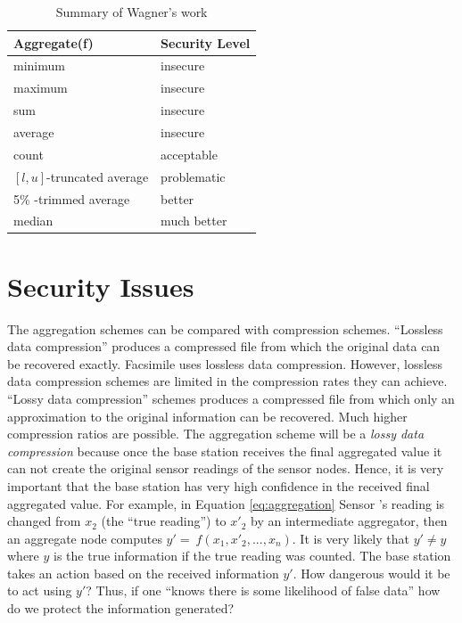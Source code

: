 	\begin{table}[!htb]	
		\begin{center}
		\caption{Summary of Wagner's work}
			\begin{tabular}{ |l| l| }
				\hline
			    Aggregate(f) & Security Level \\
			    \hline
			    minimum & insecure \\
			    maximum & insecure \\
			    sum & insecure \\
				average & insecure \\
				count & acceptable \\
				$[l,u]$-truncated average & problematic \\
				5\% -trimmed average & better \\
				median & much better \\
			    \hline
			\end{tabular}
		\end{center}
		\label{table:wagner}
	\end{table}

\section{Security Issues}
	\label{sec:security-issues}
	
	The aggregation schemes can be compared with compression schemes.
	``Lossless data compression'' \cite{alberto2000communication} produces a compressed file from which the original data can be recovered exactly.
	Facsimile uses lossless data compression.
	However, lossless data compression schemes are limited in the compression rates they can achieve.
	``Lossy data compression'' \cite{alberto2000communication} schemes produces a compressed file from which only an approximation to the original information can be recovered. Much higher compression ratios are possible.
	The aggregation scheme will be a \textit{lossy data compression} because once the base station receives the final aggregated value it can not create the original sensor readings of the sensor nodes.
	Hence, it is very important that the base station has very high confidence in the received final aggregated value. 
	For example, in Equation \ref{eq:aggregation} Sensor 's reading is changed from $x_{2}$ (the ``true reading'') to $x'_{2}$ by an intermediate aggregator, then an aggregate node computes $y' =\ f(x_{1},x'_{2},...,x_{n})$.
	It is very likely that $y' \neq y$ where $y$ is the true information if the true reading was counted.
	The base station takes an action based on the received information $y'$.
	How dangerous would it be to act using $y'$?
	Thus, if one ``knows there is some likelihood of false data'' how do we protect the information generated?


